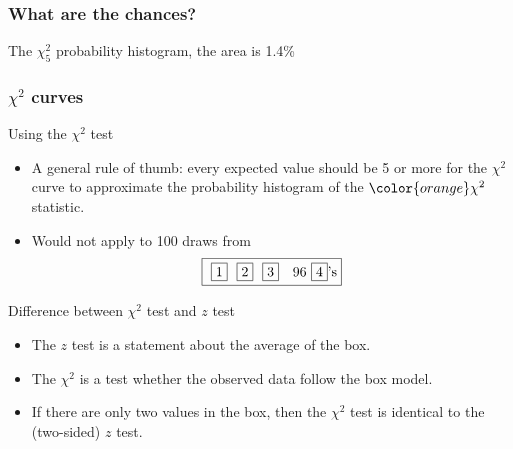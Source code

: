 \documentclass[handout]{beamer}
\begin{document}


   \begin{frame}
   \frametitle{What are the chances?}
   \begin{center}
   \end{center}
   The $\chi^2_5$ probability histogram, the area is 1.4\%
   \end{frame}


   \begin{frame} \frametitle{$\chi^2$ curves}

   \begin{block}
   {Using the $\chi^2$ test}

   \begin{itemize}
   \item A general rule of thumb: every expected value should be 5 or more
   for the $\chi^2$ curve to approximate the probability
   histogram of the ${\color{orange} \chi^2}$ statistic.

   \item Would not apply to 100 draws from
     $$
       \fbox{ \fbox{1} \ \fbox{2} \  \fbox{3} \ \ 96 \fbox{4}'s}
     $$


   \end{itemize}
   \end{block}

   \begin{block}
     {Difference between $\chi^2$ test and $z$ test}
     \begin{itemize}
     \item The $z$ test is a statement about the average of the box.
     \item The $\chi^2$ is a test whether the  observed data follow the
     box model.
     \item If there are only two values in the box, then the
     $\chi^2$ test is identical to the (two-sided) $z$ test.
     \end{itemize}
   \end{block}
   \end{frame}
\end{document}
